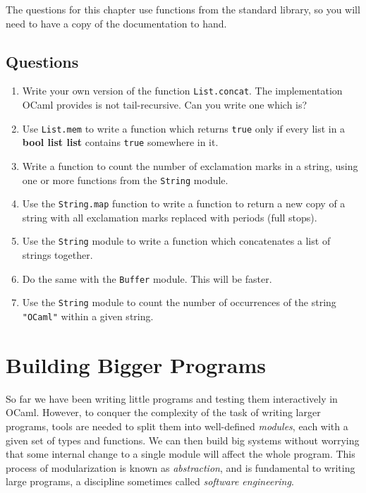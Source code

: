 \documentclass[]{book}
\begin{document}
The questions for this chapter use functions from the standard library, so you will need to have a copy of the documentation to hand.

\clearpage
\section*{Questions}

\begin{enumerate}
  \item Write your own version of the function \texttt{List.concat}. The implementation OCaml provides is not tail-recursive. Can you write one which is?
  \item Use \texttt{List.mem} to write a function which returns \texttt{true} only if every list in a \textsf{\textbf{bool list list}} contains \texttt{true} somewhere in it.
  \item Write a function to count the number of exclamation marks in a string, using one or more functions from the \texttt{String} module.
  \item Use the \texttt{String.map} function to write a function to return a new copy of a string with all exclamation marks replaced with periods (full stops).
  \item Use the \texttt{String} module to write a function which concatenates a list of strings together.
  \item Do the same with the \texttt{Buffer} module. This will be faster.
  \item Use the \texttt{String} module to count the number of occurrences of the string \texttt{"OCaml"} within a given string.
\end{enumerate}

\cleardoublepage
\thispagestyle{empty}

\pagestyle{empty}


\chapter{Building Bigger Programs}
\pagestyle{fancy}

So far we have been writing little programs and testing them interactively in OCaml. However, to conquer the complexity of the task of writing larger programs, tools are needed to split them into well-defined \textit{modules}, each with a given set of types and functions. We can then build big systems without worrying that some internal change to a single module will affect the whole program. This process of modularization is known as \textit{abstraction}, and is fundamental to writing large programs, a discipline sometimes called \textit{software engineering}.
\end{document}
